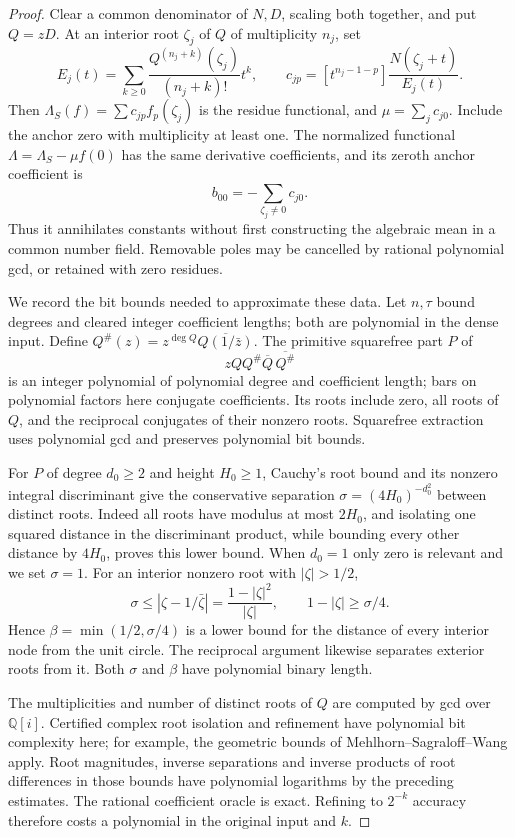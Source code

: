 \documentclass[11pt,a4paper]{article}
\theoremstyle{remark}\newtheorem{remark}[theorem]{Remark}
\begin{document}
\begin{proof}
Clear a common denominator of \(N,D\), scaling both together,
and put \(Q=zD\). At an interior root \(\zeta_j\) of \(Q\)
of multiplicity \(n_j\), set
\[
 E_j(t)=\sum_{k\geq0}\frac{Q^{(n_j+k)}(\zeta_j)}{(n_j+k)!}t^k,
 \qquad c_{jp}=[t^{n_j-1-p}]\frac{N(\zeta_j+t)}{E_j(t)}.
\]
Then \(\Lambda_S(f)=\sum c_{jp}f_p(\zeta_j)\) is the residue
functional, and \(\mu=\sum_jc_{j0}\). Include the anchor zero
with multiplicity at least one. The normalized functional
\(\Lambda=\Lambda_S-\mu f(0)\) has the same derivative
coefficients, and its zeroth anchor coefficient is
\[
 b_{00}=-\sum_{\zeta_j\ne0}c_{j0}.
\]
Thus it annihilates constants without first constructing the
algebraic mean in a common number field. Removable poles may be
cancelled by rational polynomial gcd, or retained with zero residues.

We record the bit bounds needed to approximate these data. Let
\(n,\tau\) bound degrees and cleared integer coefficient lengths;
both are polynomial in the dense input. Define
\(Q^\#(z)=z^{\deg Q}\overline{Q(1/\bar z)}\).
The primitive squarefree part \(P\) of
\[
 zQQ^\#\overline Q\,\overline{Q^\#}
\]
is an integer polynomial of polynomial degree and coefficient
length; bars on polynomial factors here conjugate coefficients.
Its roots include zero, all roots of \(Q\), and the reciprocal
conjugates of their nonzero roots. Squarefree extraction uses
polynomial gcd and preserves polynomial bit bounds.

For \(P\) of degree \(d_0\geq2\) and height \(H_0\geq1\),
Cauchy's root bound and its nonzero integral discriminant give the
conservative separation
\(\sigma=(4H_0)^{-d_0^2}\) between distinct roots. Indeed all
roots have modulus at most \(2H_0\), and isolating one squared
distance in the discriminant product, while bounding every other
distance by \(4H_0\), proves this lower bound. When \(d_0=1\)
only zero is relevant and we set \(\sigma=1\).
For an interior nonzero root with \(|\zeta|>1/2\),
\[
 \sigma\leq|\zeta-1/\bar\zeta|
 =\frac{1-|\zeta|^2}{|\zeta|},\qquad
 1-|\zeta|\geq\sigma/4.
\]
Hence \(\beta=\min(1/2,\sigma/4)\) is a lower bound for
the distance of every interior node from the unit circle.
The reciprocal argument likewise separates exterior roots from it.
Both \(\sigma\) and \(\beta\) have polynomial binary length.

The multiplicities and number of distinct roots of \(Q\) are
computed by gcd over \(\mathbb Q[i]\). Certified complex root
isolation and refinement have polynomial bit complexity here;
for example, the geometric bounds of
Mehlhorn--Sagraloff--Wang \cite[Theorems~3--4]{msw} apply.
Root magnitudes, inverse separations and inverse products of
root differences in those bounds have polynomial logarithms by
the preceding estimates. The rational coefficient oracle is exact.
Refining to \(2^{-k}\) accuracy therefore costs a polynomial in
the original input and \(k\).


\end{proof}
\end{document}
